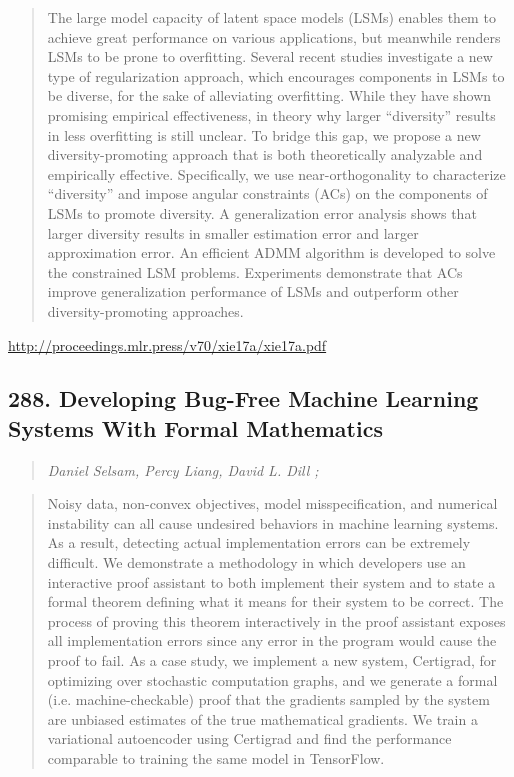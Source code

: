 \documentclass{article}
\begin{document}
\begin{quote}
    The large model capacity of latent space models (LSMs) enables them to achieve great performance on various applications, but meanwhile renders LSMs to be prone to overfitting. Several recent studies investigate a new type of regularization approach, which encourages components in LSMs to be diverse, for the sake of alleviating overfitting. While they have shown promising empirical effectiveness, in theory why larger “diversity” results in less overfitting is still unclear. To bridge this gap, we propose a new diversity-promoting approach that is both theoretically analyzable and empirically effective. Specifically, we use near-orthogonality to characterize “diversity” and impose angular constraints (ACs) on the components of LSMs to promote diversity. A generalization error analysis shows that larger diversity results in smaller estimation error and larger approximation error. An efficient ADMM algorithm is developed to solve the constrained LSM problems. Experiments demonstrate that ACs improve generalization performance of LSMs and outperform other diversity-promoting approaches.  
\end{quote}

\href{http://proceedings.mlr.press/v70/xie17a/xie17a.pdf}{http://proceedings.mlr.press/v70/xie17a/xie17a.pdf}

\subsection{288. Developing Bug-Free Machine Learning Systems With Formal Mathematics}

\begin{quote}
\footnotesize{\textit{Daniel Selsam, Percy Liang, David L. Dill ;}}

\end{quote}

\begin{quote}
    Noisy data, non-convex objectives, model misspecification, and numerical instability can all cause undesired behaviors in machine learning systems. As a result, detecting actual implementation errors can be extremely difficult. We demonstrate a methodology in which developers use an interactive proof assistant to both implement their system and to state a formal theorem defining what it means for their system to be correct. The process of proving this theorem interactively in the proof assistant exposes all implementation errors since any error in the program would cause the proof to fail. As a case study, we implement a new system, Certigrad, for optimizing over stochastic computation graphs, and we generate a formal (i.e. machine-checkable) proof that the gradients sampled by the system are unbiased estimates of the true mathematical gradients. We train a variational autoencoder using Certigrad and find the performance comparable to training the same model in TensorFlow.  
\end{quote}
\end{document}
